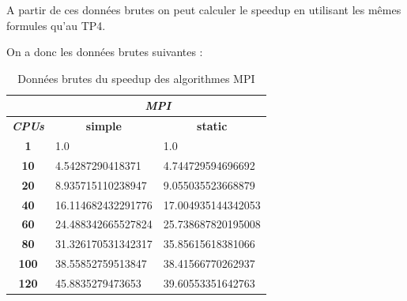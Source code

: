 \documentclass[12pt,a4paper,oneside, titlepage]{report}
\begin{document}
		\newpage

		A partir de ces données brutes on peut calculer le speedup en utilisant les mêmes formules qu'au TP4.

		On a donc les données brutes suivantes :


		\begin{table}[H]
			\centering
			\begin{tabular}{c|l|l|}
				\cline{2-3}
				\multicolumn{1}{l|}{}                                      & \multicolumn{2}{c|}{\textit{\textbf{MPI}}}                                                                                  \\ \hline
				\multicolumn{1}{|c|}{\textit{\textbf{CPUs}}}               & \multicolumn{1}{c|}{\cellcolor[HTML]{EFEFEF}\textbf{simple}} & \multicolumn{1}{c|}{\cellcolor[HTML]{EFEFEF}\textbf{static}} \\ \hline
				\multicolumn{1}{|c|}{\cellcolor[HTML]{EFEFEF}\textbf{1}}   & 1.0                                                          & 1.0                                                          \\ \hline
				\multicolumn{1}{|c|}{\cellcolor[HTML]{EFEFEF}\textbf{10}}  & 4.54287290418371                                             & 4.744729594696692                                            \\ \hline
				\multicolumn{1}{|c|}{\cellcolor[HTML]{EFEFEF}\textbf{20}}  & 8.935715110238947                                            & 9.055035523668879                                            \\ \hline
				\multicolumn{1}{|c|}{\cellcolor[HTML]{EFEFEF}\textbf{40}}  & 16.114682432291776                                           & 17.004935144342053                                           \\ \hline
				\multicolumn{1}{|c|}{\cellcolor[HTML]{EFEFEF}\textbf{60}}  & 24.488342665527824                                           & 25.738687820195008                                           \\ \hline
				\multicolumn{1}{|c|}{\cellcolor[HTML]{EFEFEF}\textbf{80}}  & 31.326170531342317                                           & 35.85615618381066                                            \\ \hline
				\multicolumn{1}{|c|}{\cellcolor[HTML]{EFEFEF}\textbf{100}} & 38.55852759513847                                            & 38.41566770262937                                            \\ \hline
				\multicolumn{1}{|c|}{\cellcolor[HTML]{EFEFEF}\textbf{120}} & 45.8835279473653                                             & 39.60553351642763                                            \\ \hline
			\end{tabular}
			\caption{Données brutes du speedup des algorithmes MPI}
		\end{table}
\end{document}
